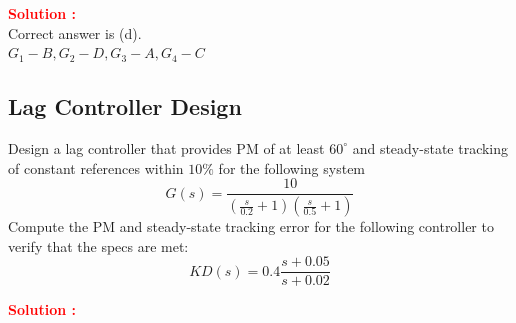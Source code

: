 \documentclass[12pt]{article}
\begin{document}
\textbf{\textcolor{red}{Solution :}} \\
Correct answer is (d).\\
\(G_1-B,G_2-D,G_3-A,G_4-C\)
\clearpage

\subsection{Lag Controller Design}


Design a lag controller that provides PM of at least \(60^{\circ}\) and steady-state tracking of constant references within \(10 \%\) for the following system
\[
G(s)=\frac{10}{\left(\frac{s}{0.2}+1\right)\left(\frac{s}{0.5}+1\right)}
\]
Compute the PM and steady-state tracking error for the following controller to verify that the specs are met:
    \[
        K D(s)=0.4 \frac{s+0.05}{s+0.02}
    \]


\textbf{\textcolor{red}{Solution :}} \\
\end{document}
